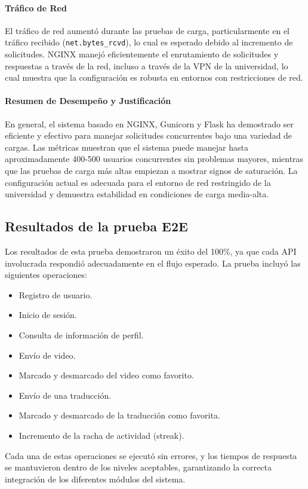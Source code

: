 \paragraph{Tráfico de Red}
El tráfico de red aumentó durante las pruebas de carga, particularmente en el tráfico recibido (\texttt{net.bytes\_rcvd}), lo cual es esperado debido al incremento de solicitudes. NGINX manejó eficientemente el enrutamiento de solicitudes y respuestas a través de la red, incluso a través de la VPN de la universidad, lo cual muestra que la configuración es robusta en entornos con restricciones de red.

\paragraph{Resumen de Desempeño y Justificación}
En general, el sistema basado en NGINX, Gunicorn y Flask ha demostrado ser eficiente y efectivo para manejar solicitudes concurrentes bajo una variedad de cargas. Las métricas muestran que el sistema puede manejar hasta aproximadamente 400-500 usuarios concurrentes sin problemas mayores, mientras que las pruebas de carga más altas empiezan a mostrar signos de saturación. La configuración actual es adecuada para el entorno de red restringido de la universidad y demuestra estabilidad en condiciones de carga media-alta.

\subsection{Resultados de la prueba E2E}
Los resultados de esta prueba demostraron un éxito del 100\%, ya que cada API involucrada respondió adecuadamente en el flujo esperado. La prueba incluyó las siguientes operaciones:
\begin{itemize}
    \item Registro de usuario.
    \item Inicio de sesión.
    \item Consulta de información de perfil.
    \item Envío de video.
    \item Marcado y desmarcado del video como favorito.
    \item Envío de una traducción.
    \item Marcado y desmarcado de la traducción como favorita.
    \item Incremento de la racha de actividad (streak).
\end{itemize}

Cada una de estas operaciones se ejecutó sin errores, y los tiempos de respuesta se mantuvieron dentro de los niveles aceptables, garantizando la correcta integración de los diferentes módulos del sistema.

